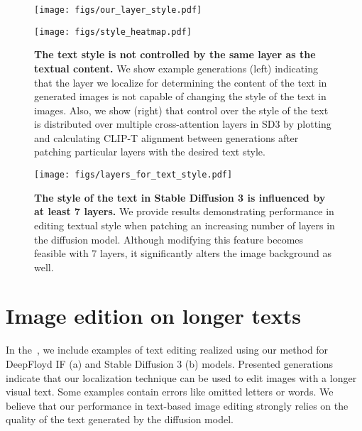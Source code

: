 \begin{figure}[h]
    \centering
    \begin{minipage}[h]{0.5\linewidth}
        \centering
        \texttt{[image: figs/our\_layer\_style.pdf]}
    \end{minipage}
    \hspace{0.05\linewidth}
    \begin{minipage}[h]{0.4\linewidth}
        \centering
        \texttt{[image: figs/style\_heatmap.pdf]}
    \end{minipage}
    \caption{\textbf{The text style is not controlled by the same layer as the textual content.} We show example generations (left) indicating that the layer we localize for determining the content of the text in generated images is not capable of changing the style of the text in images. Also, we show (right) that control over the style of the text is distributed over multiple cross-attention layers in SD3 by plotting and calculating CLIP-T alignment between generations after patching particular layers with the desired text style. \label{fig:our_layer_style}}
\end{figure}

\begin{figure}[h]
    \centering
    \texttt{[image: figs/layers\_for\_text\_style.pdf]}
    \caption{\textbf{The style of the text in Stable Diffusion 3 is influenced by at least 7 layers.} We provide results demonstrating performance in editing textual style when patching an increasing number of layers in the diffusion model. Although modifying this feature becomes feasible with 7 layers, it significantly alters the image background as well.\label{fig:style_layers}}
\end{figure}

\section{Image edition on longer texts}\label{app:results_edit}

In the~, we include examples of text editing realized using our method for DeepFloyd IF (a) and Stable Diffusion 3 (b) models. Presented generations indicate that our localization technique can be used to edit images with a longer visual text. Some examples contain errors like omitted letters or words. We believe that our performance in text-based image editing strongly relies on the quality of the text generated by the diffusion model.

